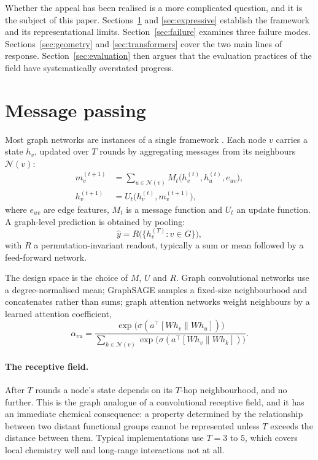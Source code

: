\documentclass[11pt,a4paper]{article}
\begin{document}
Whether the appeal has been realised is a more complicated question, and it is
the subject of this paper. Sections~\ref{sec:mpnn} and \ref{sec:expressive}
establish the framework and its representational limits.
Section~\ref{sec:failure} examines three failure modes.
Sections~\ref{sec:geometry} and \ref{sec:transformers} cover the two main
lines of response. Section~\ref{sec:evaluation} then argues that the
evaluation practices of the field have systematically overstated progress.

\section{Message passing}
\label{sec:mpnn}

Most graph networks are instances of a single framework \cite{gilmer2017}.
Each node $v$ carries a state $h_v$, updated over $T$ rounds by aggregating
messages from its neighbours $\mathcal{N}(v)$:
\begin{align}
  m_v^{(t+1)} &= \sum_{u \in \mathcal{N}(v)}
                 M_t\big(h_v^{(t)}, h_u^{(t)}, e_{uv}\big),
  \label{eq:message} \\
  h_v^{(t+1)} &= U_t\big(h_v^{(t)}, m_v^{(t+1)}\big),
  \label{eq:update}
\end{align}
where $e_{uv}$ are edge features, $M_t$ is a message function and $U_t$ an
update function. A graph-level prediction is obtained by pooling:
\begin{equation}
  \hat{y} = R\big(\{ h_v^{(T)} : v \in G \}\big),
\end{equation}
with $R$ a permutation-invariant readout, typically a sum or mean followed by
a feed-forward network.

The design space is the choice of $M$, $U$ and $R$. Graph convolutional
networks \cite{kipf2017} use a degree-normalised mean; GraphSAGE
\cite{hamilton2017} samples a fixed-size neighbourhood and concatenates rather
than sums; graph attention networks \cite{velickovic2018} weight neighbours by
a learned attention coefficient,
\begin{equation}
  \alpha_{vu} = \frac{\exp\big(\sigma(a^{\top}[Wh_v \| Wh_u])\big)}
                      {\sum_{k \in \mathcal{N}(v)}
                       \exp\big(\sigma(a^{\top}[Wh_v \| Wh_k])\big)}.
\end{equation}

\paragraph{The receptive field.}
After $T$ rounds a node's state depends on its $T$-hop neighbourhood, and no
further. This is the graph analogue of a convolutional receptive field, and it
has an immediate chemical consequence: a property determined by the
relationship between two distant functional groups cannot be represented
unless $T$ exceeds the distance between them. Typical implementations use
$T = 3$ to $5$, which covers local chemistry well and long-range interactions
not at all.
\end{document}
